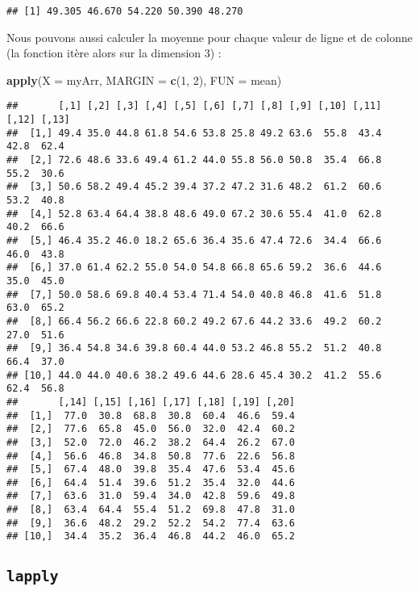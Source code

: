 \documentclass[]{book}
\newenvironment{Shaded}{\begin{snugshade}}{\end{snugshade}}
\newcommand{\KeywordTok}[1]{\textcolor[rgb]{0.13,0.29,0.53}{\textbf{#1}}}
\newcommand{\DataTypeTok}[1]{\textcolor[rgb]{0.13,0.29,0.53}{#1}}
\newcommand{\DecValTok}[1]{\textcolor[rgb]{0.00,0.00,0.81}{#1}}
\newcommand{\NormalTok}[1]{#1}
\theoremstyle{definition}
\theoremstyle{definition}
\theoremstyle{definition}
\theoremstyle{remark}
\begin{document}
\begin{verbatim}
## [1] 49.305 46.670 54.220 50.390 48.270
\end{verbatim}

Nous pouvons aussi calculer la moyenne pour chaque valeur de ligne et de
colonne (la fonction itère alors sur la dimension 3) :

\begin{Shaded}
\begin{Highlighting}[]
\KeywordTok{apply}\NormalTok{(}\DataTypeTok{X =}\NormalTok{ myArr, }\DataTypeTok{MARGIN =} \KeywordTok{c}\NormalTok{(}\DecValTok{1}\NormalTok{, }\DecValTok{2}\NormalTok{), }\DataTypeTok{FUN =}\NormalTok{ mean)}
\end{Highlighting}
\end{Shaded}

\begin{verbatim}
##       [,1] [,2] [,3] [,4] [,5] [,6] [,7] [,8] [,9] [,10] [,11] [,12] [,13]
##  [1,] 49.4 35.0 44.8 61.8 54.6 53.8 25.8 49.2 63.6  55.8  43.4  42.8  62.4
##  [2,] 72.6 48.6 33.6 49.4 61.2 44.0 55.8 56.0 50.8  35.4  66.8  55.2  30.6
##  [3,] 50.6 58.2 49.4 45.2 39.4 37.2 47.2 31.6 48.2  61.2  60.6  53.2  40.8
##  [4,] 52.8 63.4 64.4 38.8 48.6 49.0 67.2 30.6 55.4  41.0  62.8  40.2  66.6
##  [5,] 46.4 35.2 46.0 18.2 65.6 36.4 35.6 47.4 72.6  34.4  66.6  46.0  43.8
##  [6,] 37.0 61.4 62.2 55.0 54.0 54.8 66.8 65.6 59.2  36.6  44.6  35.0  45.0
##  [7,] 50.0 58.6 69.8 40.4 53.4 71.4 54.0 40.8 46.8  41.6  51.8  63.0  65.2
##  [8,] 66.4 56.2 66.6 22.8 60.2 49.2 67.6 44.2 33.6  49.2  60.2  27.0  51.6
##  [9,] 36.4 54.8 34.6 39.8 60.4 44.0 53.2 46.8 55.2  51.2  40.8  66.4  37.0
## [10,] 44.0 44.0 40.6 38.2 49.6 44.6 28.6 45.4 30.2  41.2  55.6  62.4  56.8
##       [,14] [,15] [,16] [,17] [,18] [,19] [,20]
##  [1,]  77.0  30.8  68.8  30.8  60.4  46.6  59.4
##  [2,]  77.6  65.8  45.0  56.0  32.0  42.4  60.2
##  [3,]  52.0  72.0  46.2  38.2  64.4  26.2  67.0
##  [4,]  56.6  46.8  34.8  50.8  77.6  22.6  56.8
##  [5,]  67.4  48.0  39.8  35.4  47.6  53.4  45.6
##  [6,]  64.4  51.4  39.6  51.2  35.4  32.0  44.6
##  [7,]  63.6  31.0  59.4  34.0  42.8  59.6  49.8
##  [8,]  63.4  64.4  55.4  51.2  69.8  47.8  31.0
##  [9,]  36.6  48.2  29.2  52.2  54.2  77.4  63.6
## [10,]  34.4  35.2  36.4  46.8  44.2  46.0  65.2
\end{verbatim}

\subsection{\texorpdfstring{\texttt{lapply}}{lapply}}\label{l17sapply}
\end{document}
